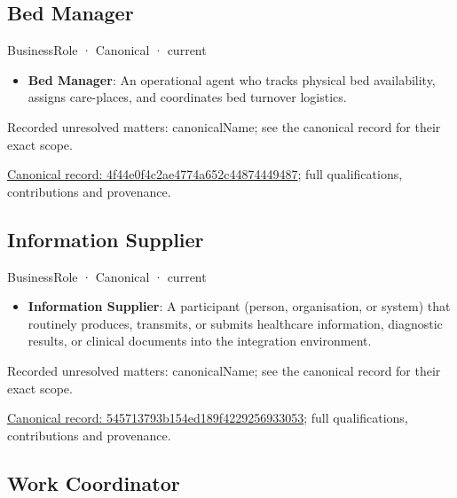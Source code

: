 \subsection{Bed Manager}

\label{element:4f44e0f4c2ae4774a652c44874449487}
{\small BusinessRole · Canonical · current}\par

\begin{itemize}


\item \textbf{Bed Manager}: An operational agent who tracks physical bed availability, assigns care-places, and coordinates bed turnover logistics.

\end{itemize}

{\small Recorded unresolved matters: canonicalName; see the canonical record for their exact scope.}\par
{\footnotesize \href{../../../../continuum/business/business-role/4f44e0f4c2ae4774a652c44874449487.md}{Canonical record: 4f44e0f4c2ae4774a652c44874449487}; full qualifications, contributions and provenance.}\par
\subsection{Information Supplier}

\label{element:545713793b154ed189f4229256933053}
{\small BusinessRole · Canonical · current}\par

\begin{itemize}


\item \textbf{Information Supplier}: A participant (person, organisation, or system) that routinely produces, transmits, or submits healthcare information, diagnostic results, or clinical documents into the integration environment.

\end{itemize}

{\small Recorded unresolved matters: canonicalName; see the canonical record for their exact scope.}\par
{\footnotesize \href{../../../../continuum/business/business-role/545713793b154ed189f4229256933053.md}{Canonical record: 545713793b154ed189f4229256933053}; full qualifications, contributions and provenance.}\par
\subsection{Work Coordinator}

